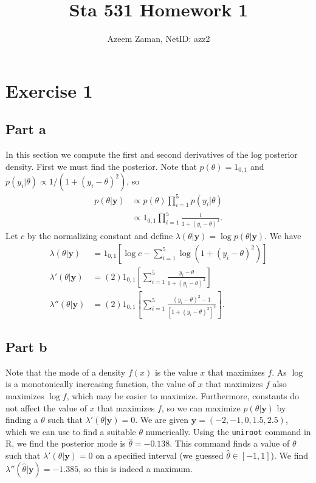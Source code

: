 \documentclass[a4paper,10pt]{article}
\title{Sta 531 Homework 1}
\author{Azeem Zaman, NetID: azz2}
\newcommand{\by}{\mathbf{y}}
\newcommand{\htheta}{\hat{\theta}}
\begin{document}
\maketitle


\section{Exercise 1}
\subsection{Part a}
In this section we compute the first and second derivatives of the log posterior density.  First we must find the posterior.  Note that $p(\theta) = 1_{0,1}$ and $p(y_i|\theta) \propto 1/(1+(y_i-\theta)^2)$, so
\begin{align*}
 p(\theta|\by) &\propto p(\theta)\prod_{i=1}^5{p(y_i|\theta)} \\
 &\propto 1_{0,1}\prod_{i=1}^5{\frac{1}{1+(y_i-\theta)^2}}.
\end{align*}
Let $c$ by the normalizing constant and define $\lambda(\theta|\by)=\log{p(\theta|\by)}$. We have
\begin{align*}
 \lambda(\theta|\by) &= 1_{0,1}\left[\log{c}-\sum_{i=1}^5{\log(1 + (y_i - \theta)^2)}\right] \\
 \lambda'(\theta|\by) &= (2)1_{0,1}\left[\sum_{i=1}^5\frac{y_i - \theta}{1 + (y_i - \theta)^2}\right] \\
 \lambda''(\theta|\by) &= (2)1_{0,1}\left[\sum_{i=1}^5\frac{(y_i-\theta)^2-1}{\left[1+(y_i-\theta)^2\right]^2}\right].
\end{align*}
\subsection{Part b}
Note that the mode of a density $f(x)$ is the value $x$ that maximizes $f$.  As $\log$ is a monotonically increasing function, the value of $x$ that maximizes $f$ also maximizes $\log{f}$, which may be easier to maximize.  Furthermore, constants do not affect the value of $x$ that maximizes $f$, so we can maximize $p(\theta|\by)$ by finding a $\theta$ such that $\lambda'(\theta|\by) = 0$.  We are given $\by = (-2,-1,0,1.5,2.5)$, which we can use to find a suitable $\theta$ numerically.  Using the \texttt{uniroot} command in R, we find the posterior mode is $\hat{\theta} = -0.138$.  This command finds a value of $\theta$ such that $\lambda'(\theta|\by)=0$ on a specified interval (we guessed $\htheta \in [-1,1]$).  We find $\lambda''(\hat{\theta}|\by)=-1.385$, so this is indeed a maximum.  
\end{document}
